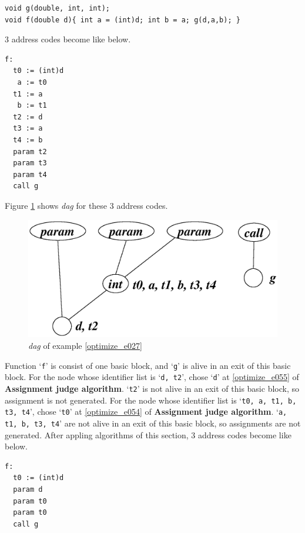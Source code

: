 \begin{Example}
\label{optimize_e027}
\begin{verbatim}
void g(double, int, int);
void f(double d){ int a = (int)d; int b = a; g(d,a,b); }
\end{verbatim}
3 address codes become like below.
\begin{verbatim}
f:
  t0 := (int)d
   a := t0
  t1 := a
   b := t1
  t2 := d
  t3 := a
  t4 := b
  param t2
  param t3
  param t4
  call g
\end{verbatim}
Figure \ref{optimize_e028} shows {\em dag} for these 3 address codes.
\begin{figure}[htbp]
\begin{center}
\includegraphics[width=1.0\linewidth,height=0.483\linewidth]{opt012.eps}
\caption{{\em dag} of example \ref{optimize_e027}}
\label{optimize_e028}
\end{center}
\end{figure}
Function `{\tt{f}}' is consist of one basic block, and 
`{\tt{g}}' is alive in an exit of this basic block.
For the node whose identifier list is `{\tt{d, t2}}',
chose `{\tt{d}}' at \ref{optimize_e055} of {\bf Assignment judge
 algorithm}.
`{\tt{t2}}' is not alive in an exit of this basic block, so
assignment is not generated.
For the node whose identifier list is `{\tt{t0, a, t1, b, t3, t4}}',
chose `{\tt{t0}}' at \ref{optimize_e054} of {\bf Assignment judge
 algorithm}.
`{\tt{a, t1, b, t3, t4}}' are not alive in an exit of this basic block, so
assignments are not generated.
After appling algorithms of this section,
3 address codes become like below.
\begin{verbatim}
f:
  t0 := (int)d
  param d
  param t0
  param t0
  call g
\end{verbatim}
\end{Example}

